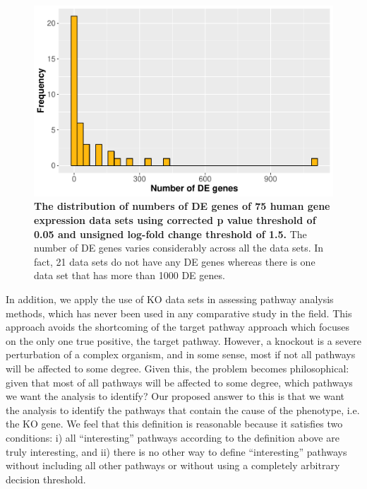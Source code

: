 \begin{figure}
\centering
  \captionsetup{width=.6\linewidth}
	\includegraphics[width=0.6\linewidth]{../Figures/NrDE75}
	\caption{\textbf{The distribution of numbers of DE genes of 75 human gene expression data sets using corrected p value threshold of 0.05 and unsigned log-fold change threshold of 1.5.} The number of DE genes varies considerably across all the data sets. In fact, 21 data sets do not have any DE genes whereas there is one data set that has more than 1000 DE genes.}\label{fig:NrDE75}
\end{figure}

%

In addition, we apply the use of KO data sets in assessing pathway analysis methods, which has never been used in any comparative study in the field.
This approach avoids the shortcoming of the target pathway approach  which focuses on the only one true positive, the target pathway.
However, a knockout is a severe perturbation of a complex organism, and in some sense, most if not all pathways will be affected to some degree.  Given this, the problem becomes philosophical: given that most of all pathways will be affected to some degree, which pathways we want the analysis to identify? Our proposed answer to this is that we want the analysis to identify the pathways that contain the cause of the phenotype, i.e. the KO gene. We feel that this definition is reasonable because it satisfies two conditions: i) all ``interesting'' pathways according to the definition above are truly interesting, and ii) there is no other way to define ``interesting'' pathways without including all other pathways or without using a completely arbitrary decision threshold.

